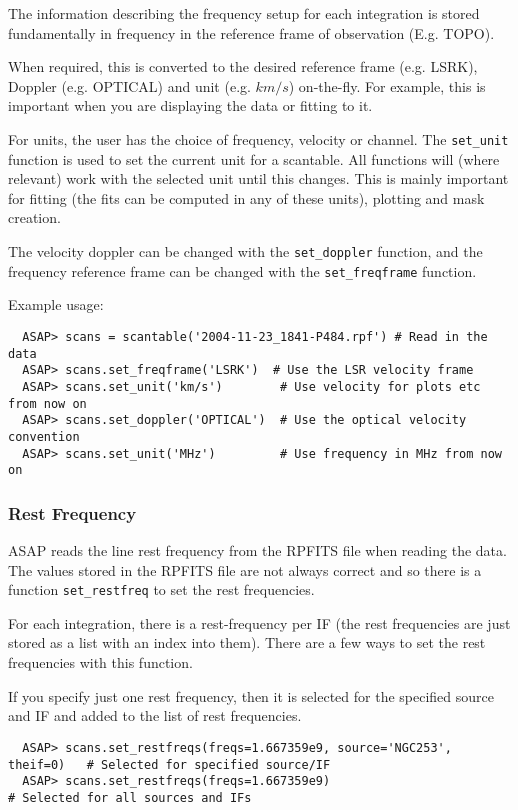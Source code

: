 \documentclass[11pt]{article}
\newcommand{\cmd}[1]{{\tt #1}}
\begin{document}
The information describing the frequency setup for each integration
is stored fundamentally in frequency in the reference frame
of observation (E.g. TOPO).   

When required, this is converted to the desired reference frame (e.g. LSRK),
Doppler (e.g. OPTICAL) and unit (e.g. $km/s$) on-the-fly.  For example,
this is important when you are displaying the data or fitting to it.

For units, the user has the choice of frequency, velocity or channel.
The \cmd{set\_unit} function is used to set the current unit for a
scantable. All functions will (where relevant) work with the selected
unit until this changes. This is mainly important for fitting (the fits
can be computed in any of these units), plotting and mask creation. 

The velocity doppler can be changed with the \cmd{set\_doppler}
function, and the frequency reference frame can be changed with the 
\cmd{set\_freqframe} function.

Example usage:

\begin{verbatim}
  ASAP> scans = scantable('2004-11-23_1841-P484.rpf') # Read in the data
  ASAP> scans.set_freqframe('LSRK')  # Use the LSR velocity frame
  ASAP> scans.set_unit('km/s')        # Use velocity for plots etc from now on
  ASAP> scans.set_doppler('OPTICAL')  # Use the optical velocity convention
  ASAP> scans.set_unit('MHz')         # Use frequency in MHz from now on
\end{verbatim}


\subsubsection{Rest Frequency}

ASAP reads the line rest frequency from the RPFITS file when reading
the data. The values stored in the RPFITS file are not always correct
and so there is a function \cmd{set\_restfreq} to set the rest frequencies.

For each integration, there is a rest-frequency per IF (the rest
frequencies are just stored as a list with an index into them).
There are a few ways to set the rest frequencies with this function.

If you specify just one rest frequency, then it is selected for the
specified source and IF and added to the list of rest frequencies.

\begin{verbatim}
  ASAP> scans.set_restfreqs(freqs=1.667359e9, source='NGC253', theif=0)   # Selected for specified source/IF
  ASAP> scans.set_restfreqs(freqs=1.667359e9)                             # Selected for all sources and IFs
\end{verbatim}
\end{document}
